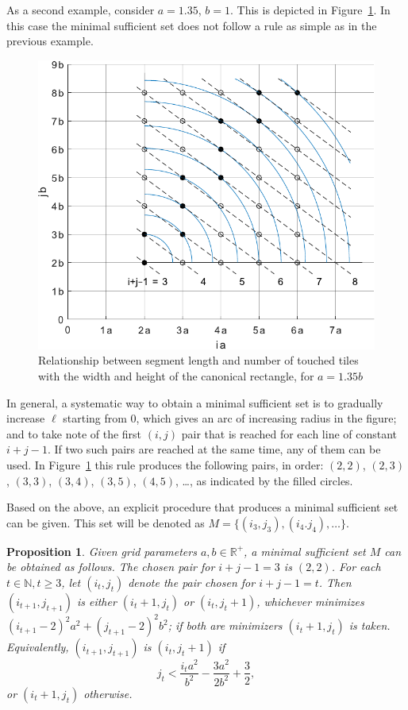 \documentclass[12pt, a4paper]{article}
\newcommand{\len}{\ell} %
\newcommand{\tiles}{t} %
\newcommand{\mss}{M}
\newtheorem{proposition}{Proposition}%
\begin{document}
As a second example, consider $a=1.35$, $b=1$. This is depicted in Figure~\ref{fig: ijLS_1p35}. In this case the minimal sufficient set does not follow a rule as simple as in the previous example.

\begin{figure}
\centering%
\includegraphics[width=.7\textwidth]{ijLS_1p35}%
\caption{Relationship between segment length and number of touched tiles with the width and height of the canonical rectangle, for $a=1.35b$
}%
\label{fig: ijLS_1p35}%
\end{figure}%

In general, a systematic way to obtain a minimal sufficient set is to gradually increase $\len$ starting from $0$, which gives an arc of increasing radius in the figure; and to take note of the first $(i,j)$ pair that is reached for each line of constant $i+j-1$. If two such pairs are reached at the same time, any of them can be used. In Figure~\ref{fig: ijLS_1p35} this rule produces the following pairs, in order: $(2,2)$, $(2,3)$, $(3,3)$, $(3,4)$, $(3,5)$, $(4,5)$, \ldots, as indicated by the filled circles.

Based on the above, an explicit procedure that produces a minimal sufficient set can be given. This set will be denoted as $\mss = \{(i_3,j_3), (i_4.j_4), \ldots\}$.

\begin{proposition}
\label{prop: min suff set}
Given grid parameters $a, b \in \mathbb R^+$, a minimal sufficient set $\mss$ can be obtained as follows. The chosen pair for $i+j-1=3$ is $(2,2)$. For each $\tiles \in \mathbb N, \tiles \geq 3$, let $(i_\tiles, j_\tiles)$ denote the pair chosen for $i+j-1=\tiles$. Then $(i_{\tiles+1}, j_{\tiles+1})$ is either $(i_\tiles+1, j_\tiles)$ or $(i_\tiles, j_\tiles+1)$, whichever minimizes $(i_{\tiles+1}-2)^2 a^2 + (j_{\tiles+1}-2)^2 b^2$; if both are minimizers $(i_\tiles+1, j_\tiles)$ is taken. Equivalently, $(i_{\tiles+1}, j_{\tiles+1})$ is $(i_\tiles, j_\tiles+1)$ if
\begin{equation}
\label{eq: cond for incrementing j}
j_\tiles < \frac{i_\tiles a^2}{b^2} - \frac{3a^2}{2b^2} + \frac 3 2,
\end{equation}
or $(i_\tiles+1, j_\tiles)$ otherwise.
\end{proposition}
\end{document}
